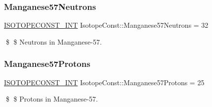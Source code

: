 \subsubsection{\texorpdfstring{Manganese57\+Neutrons}{Manganese57Neutrons}}
{\footnotesize\ttfamily \mbox{\hyperlink{group___isotope_const-_macros_ga5f18360b3e99483a35c32d789e62621c}{I\+S\+O\+T\+O\+P\+E\+C\+O\+N\+S\+T\+\_\+\+I\+NT}} Isotope\+Const\+::\+Manganese57\+Neutrons = 32}

\$ \$ Neutrons in Manganese-\/57. \mbox{\label{group___isotope_const-_manganese-_mn57_gae1f6db9c7881873cd4a4f73291623415}} 
\subsubsection{\texorpdfstring{Manganese57\+Protons}{Manganese57Protons}}
{\footnotesize\ttfamily \mbox{\hyperlink{group___isotope_const-_macros_ga5f18360b3e99483a35c32d789e62621c}{I\+S\+O\+T\+O\+P\+E\+C\+O\+N\+S\+T\+\_\+\+I\+NT}} Isotope\+Const\+::\+Manganese57\+Protons = 25}

\$ \$ Protons in Manganese-\/57. 